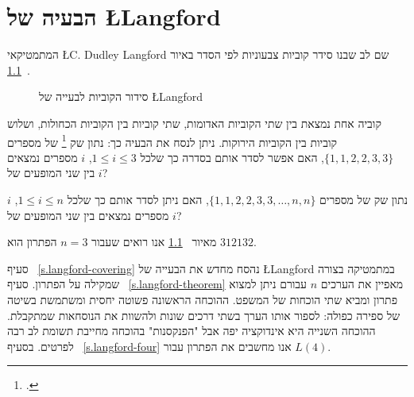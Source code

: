 
\chapter{הבעיה של 
\L{Langford}}
\label{c.langford}

המתמטיקאי
\L{C. Dudley Langford}
שם לב שבנו סידר קוביות צבעוניות לפי הסדר באיור%
~\ref{f.langford}.
\begin{figure}[h]
\begin{center}
\end{center}
\caption{סידור הקוביות לבעייה של \L{Langford}}\label{f.langford}
\end{figure}

קוביה אחת נמצאת בין שתי הקוביות האדומות, שתי קוביות בין הקוביות הכחולות, ושלוש קוביות בין הקוביות הירוקות. ניתן לנסח את הבעיה כך:
נתון שק%
\footnote{.} של מספרים
$\{1,1,2,2,3,3\}$,
האם אפשר לסדר אותם בסדרה כך שלכל
$1\leq i \leq 3$,
$i$
מספרים נמצאים בין שני המופעים של
$i$?

\begin{definition}
נתון שק של מספרים
$\{1,1,2,2,3,3,\ldots,n,n\}$,
האם ניתן לסדר אותם כך שלכל
$1\leq i \leq n$, $i$
מספרים נמצאים בין שני המופעים של
$i$?
\end{definition}
מאיור%
~\ref{f.langford}
אנו רואים שעבור 
$n=3$
הפתרון הוא
$312132$.

סעיף%
~\ref{s.langford-covering} 
נהסח מחדש את הבעייה של
\L{Langford}
במתמטיקה בצורה שמקילה על הפתרון. סעיף%
~\ref{s.langford-theorem}
מאפיין את הערכים 
$n$
עבורם ניתן למצוא פתרון ומביא שתי הוכחות של המשפט. ההוכחה הראשונה פשוטה יחסית ומשתמשת בשיטה של ספירה כפולה: לספור אותו הערך בשתי דרכים שונות ולהשוות את הנוסחאות שמתקבלת. ההוכחה השנייה היא אינדוקציה יפה אבל "הפנקסנות" בהוכחה מחייבת תשומת לב רבה לפרטים. בסעיף%
~\ref{s.langford-four}
אנו מחשבים את הפתרון עבור
$L(4)$.


